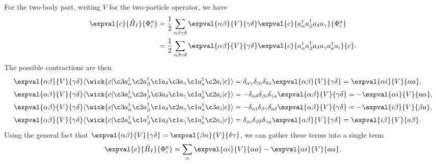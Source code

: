For the two-body part, writing $V$ for the two-particle operator, we have
\begin{align*}
    \expval{c}{\hat{H}_I}{\Phi_i^a} &= \frac{1}{2} \sum_{\alpha\beta\gamma\delta} \expval{\alpha\beta}{V}{\gamma\delta} \expval{c}{a_\alpha^\dagger a_\beta^\dagger a_\delta a_\gamma}{\Phi_i^a} \\
    &= \frac{1}{2} \sum_{\alpha\beta\gamma\delta} \expval{\alpha\beta}{V}{\gamma\delta} \expval{c}{a_\alpha^\dagger a_\beta^\dagger a_\delta a_\gamma a_a^\dagger a_i}{c}.
\end{align*}
The possible contractions are then
\begin{align*}
    \expval{\alpha\beta}{V}{\gamma\delta} \langle
    \wick{
        c
        \vert
        \c3 a_\alpha^\dagger \c2 a_\beta^\dagger \c1 a_\delta \c3 a_\gamma \c1 a_a^\dagger \c2 a_i
        \vert
        c
    }
    \rangle
    &= \delta_{\alpha \gamma} \delta_{\beta i} \delta_{\delta a} \expval{\alpha\beta}{V}{\gamma\delta}
    = \expval{\alpha i}{V}{\alpha a}, \\
    \expval{\alpha\beta}{V}{\gamma\delta} \langle
    \wick{
        c
        \vert
        \c3 a_\alpha^\dagger \c2 a_\beta^\dagger \c3 a_\delta \c1 a_\gamma \c1 a_a^\dagger \c2 a_i
        \vert
        c
    }
    \rangle
    &= -\delta_{\alpha \delta} \delta_{\beta i} \delta_{\gamma a} \expval{\alpha\beta}{V}{\gamma\delta} = -\expval{\alpha i}{V}{a \alpha}, \\
    \expval{\alpha\beta}{V}{\gamma\delta} \langle
    \wick{
        c
        \vert
        \c3 a_\alpha^\dagger \c2 a_\beta^\dagger \c1 a_\delta \c2 a_\gamma \c1 a_a^\dagger \c3 a_i
        \vert
        c
    }
    \rangle
    &= -\delta_{\alpha i} \delta_{\beta \gamma} \delta_{a \delta} \expval{\alpha\beta}{V}{\gamma\delta} = -\expval{i \beta}{V}{\beta a}, \\
    \expval{\alpha\beta}{V}{\gamma\delta} \langle
    \wick{
        c
        \vert
        \c2 a_\alpha^\dagger \c1 a_\beta^\dagger \c1 a_\delta \c1 a_\gamma \c1 a_a^\dagger \c2 a_i
        \vert
        c
    }
    \rangle
    &= \delta_{\alpha i} \delta_{\beta \delta} \delta_{\gamma a} \expval{\alpha\beta}{V}{\gamma\delta} = \expval{i \beta}{V}{a \beta}.
\end{align*}
Using the general fact that $\expval{\alpha \beta}{V}{\gamma \delta} = \expval{\beta \alpha}{V}{\delta \gamma}$, we can gather these terms into a single term
\begin{equation*}
    \expval{c}{\hat{H}_I}{\Phi_i^a} = \sum_{\alpha} \expval{\alpha i}{V}{\alpha a} - \expval{\alpha i}{V}{a \alpha}.
\end{equation*}

